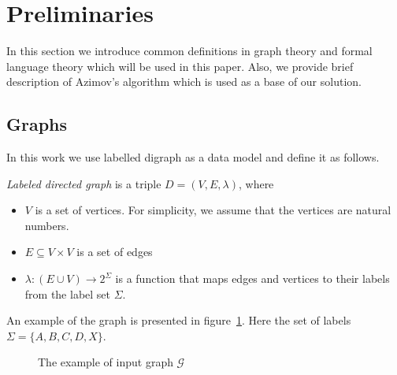 \section{Preliminaries}

In this section we introduce common definitions in graph theory and formal language theory which will be used in this paper. 
Also, we provide brief description of Azimov's algorithm which is used as a base of our solution.

\subsection{Graphs}

In this work we use labelled digraph as a data model and define it as follows.
\begin{definition} \emph{Labeled directed graph} is a triple $D = (V, E, \lambda)$, where
\begin{itemize}
    \item $V$ is a set of vertices. For simplicity, we assume that the vertices are natural numbers.
    \item $E \subseteq V \times V$ is a set of edges
    \item $\lambda : (E\cup V) \xrightarrow{} 2^\Sigma$ is a function that maps edges and vertices to their labels from the label set $\Sigma$.
\end{itemize}
\end{definition}

An example of the graph is presented in figure~\ref{fig:example_input_graph}. Here the set of labels $\Sigma = \{A, B, C, D, X\}$.

\begin{figure}[h]
    \centering        
    \caption{The example of input graph $\mathcal{G}$}
    \label{fig:example_input_graph}
\end{figure}

